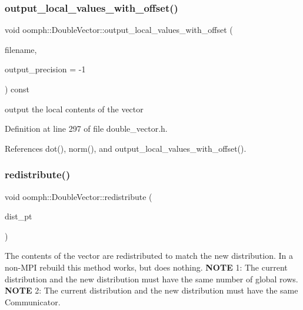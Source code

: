 \subsubsection{\texorpdfstring{output\+\_\+local\+\_\+values\+\_\+with\+\_\+offset()}{output\_local\_values\_with\_offset()}\hspace{0.1cm}{\footnotesize\ttfamily [2/2]}}
{\footnotesize\ttfamily void oomph\+::\+Double\+Vector\+::output\+\_\+local\+\_\+values\+\_\+with\+\_\+offset (\begin{DoxyParamCaption}\item[{std\+::string}]{filename,  }\item[{const int \&}]{output\+\_\+precision = {\ttfamily -\/1} }\end{DoxyParamCaption}) const\hspace{0.3cm}{\ttfamily [inline]}}



output the local contents of the vector 



Definition at line 297 of file double\+\_\+vector.\+h.



References dot(), norm(), and output\+\_\+local\+\_\+values\+\_\+with\+\_\+offset().

\mbox{\label{classoomph_1_1DoubleVector_a9396b861977c16606d8eca39056976c8}} 
\subsubsection{\texorpdfstring{redistribute()}{redistribute()}}
{\footnotesize\ttfamily void oomph\+::\+Double\+Vector\+::redistribute (\begin{DoxyParamCaption}\item[{const \hyperlink{classoomph_1_1LinearAlgebraDistribution}{Linear\+Algebra\+Distribution} $\ast$const \&}]{dist\+\_\+pt }\end{DoxyParamCaption})}



The contents of the vector are redistributed to match the new distribution. In a non-\/\+M\+PI rebuild this method works, but does nothing. {\bfseries N\+O\+TE} 1\+: The current distribution and the new distribution must have the same number of global rows. {\bfseries N\+O\+TE} 2\+: The current distribution and the new distribution must have the same Communicator. 

